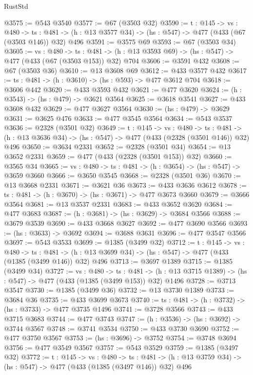 \begin{lexlean}{RustStd}
\begin{coremodule}
{\begin{coremodule}
{{{{{{{@3575 := @543 @3540
@3577 := @67 (@3503 @32)
@3590 := {t : @145} ->
  {vs : @480} ->
  {ts : @481} -> (h : @13 @3577 @34) -> (hs : @547) -> @477 (@433 (@67 (@3503 @146)) @32) @496
@3591 := @3575 @69
@3593 := @67 (@3503 @34)
@3605 := {vs : @480} ->
  {ts : @481} -> (h : @13 @3593 @69) -> (hs : @547) -> @477 (@433 (@67 (@3503 @153)) @32) @704
@3606 := @3591 @432
@3608 := @67 (@3503 @36)
@3610 := @13 @3608 @69
@3612 := @433 @3577 @432
@3617 := {ts : @481} -> (h : @3610) -> (hs : @593) -> @477 @3612 @704
@3618 := @3606 @442
@3620 := @433 @3593 @432
@3621 := @477 @3620
@3624 := (h : @3543) -> (hs : @479) -> @3621 @3564
@3625 := @3618 @3541
@3627 := @433 @3608 @432
@3629 := @477 @3627 @3564
@3630 := (hs : @479) -> @3629
@3631 := @3625 @476
@3633 := @477 @3545 @3564
@3634 := @543 @3537
@3636 := @2328 (@3501 @32)
@3649 := {t : @145} ->
  {vs : @480} ->
  {ts : @481} -> (h : @13 @3636 @34) -> (hs : @547) -> @477 (@433 (@2328 (@3501 @146)) @32) @496
@3650 := @3634 @2331
@3652 := @2328 (@3501 @34)
@3654 := @13 @3652 @2331
@3659 := @477 (@433 (@2328 (@3501 @153)) @32)
@3660 := @3565 @34
@3665 := {vs : @480} -> {ts : @481} -> (h : @3654) -> (hs : @547) -> @3659 @3660
@3666 := @3650 @3545
@3668 := @2328 (@3501 @36)
@3670 := @13 @3668 @2331
@3671 := @3621 @36
@3673 := @433 @3636 @3612
@3678 := {ts : @481} -> (h : @3670) -> (hs : @3671) -> @477 @3673 @3660
@3679 := @3666 @3564
@3681 := @13 @3537 @2331
@3683 := @433 @3652 @3620
@3684 := @477 @3683
@3687 := (h : @3681) -> (hs : @3629) -> @3684 @3566
@3688 := @3679 @3539
@3690 := @433 @3668 @3627
@3692 := @477 @3690 @3566
@3693 := (hs : @3633) -> @3692
@3694 := @3688 @3631
@3696 := @477 @3547 @3566
@3697 := @543 @3533
@3699 := @1385 (@3499 @32)
@3712 := {t : @145} ->
  {vs : @480} ->
  {ts : @481} -> (h : @13 @3699 @34) -> (hs : @547) -> @477 (@433 (@1385 (@3499 @146)) @32) @496
@3713 := @3697 @1389
@3715 := @1385 (@3499 @34)
@3727 := {vs : @480} ->
  {ts : @481} -> (h : @13 @3715 @1389) -> (hs : @547) -> @477 (@433 (@1385 (@3499 @153)) @32) @1496
@3728 := @3713 @3547
@3730 := @1385 (@3499 @36)
@3732 := @13 @3730 @1389
@3733 := @3684 @36
@3735 := @433 @3699 @3673
@3740 := {ts : @481} -> (h : @3732) -> (hs : @3733) -> @477 @3735 @1496
@3741 := @3728 @3566
@3743 := @433 @3715 @3683
@3744 := @477 @3743
@3747 := (h : @3536) -> (hs : @3692) -> @3744 @3567
@3748 := @3741 @3534
@3750 := @433 @3730 @3690
@3752 := @477 @3750 @3567
@3753 := (hs : @3696) -> @3752
@3754 := @3748 @3694
@3756 := @477 @3549 @3567
@3757 := @543 @3529
@3759 := @1385 (@3497 @32)
@3772 := {t : @145} ->
  {vs : @480} ->
  {ts : @481} -> (h : @13 @3759 @34) -> (hs : @547) -> @477 (@433 (@1385 (@3497 @146)) @32) @496
}}}}}}}
\end{coremodule}}
\end{coremodule}
\end{lexlean}
